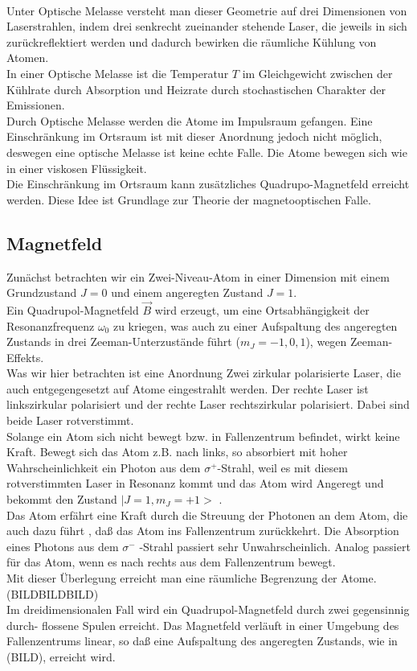 \documentclass[12pt,a4paper]{article}
\begin{document}
 \\Unter Optische Melasse versteht man dieser Geometrie auf drei Dimensionen von Laserstrahlen, indem drei senkrecht zueinander stehende Laser, die jeweils in sich zurückreflektiert werden und dadurch bewirken die räumliche Kühlung von Atomen.
 \\In einer Optische Melasse ist die Temperatur ${T}$ im Gleichgewicht zwischen der Kühlrate durch Absorption und Heizrate durch stochastischen Charakter der Emissionen.
 \\Durch Optische Melasse werden die Atome im Impulsraum gefangen. Eine Einschränkung im Ortsraum ist mit dieser Anordnung jedoch nicht möglich, deswegen eine optische Melasse ist keine echte Falle. Die Atome bewegen sich wie in einer viskosen Flüssigkeit. 
 \\Die Einschränkung im Ortsraum kann zusätzliches Quadrupo-Magnetfeld erreicht werden. Diese Idee ist Grundlage zur Theorie der magnetooptischen Falle.
  \subsection{Magnetfeld}
  Zunächst betrachten wir ein Zwei-Niveau-Atom in einer Dimension mit einem Grundzustand ${J=0}$ und einem angeregten Zustand ${J=1}$. 
  \\Ein Quadrupol-Magnetfeld ${\vec B}$ wird erzeugt, um eine Ortsabhängigkeit der Resonanzfrequenz ${\omega_0}$ zu kriegen, was auch zu einer Aufspaltung des angeregten Zustands in drei Zeeman-Unterzustände führt (${m_J=-1,0,1}$), wegen Zeeman-Effekts.
  \\Was wir hier betrachten ist eine Anordnung Zwei zirkular polarisierte Laser, die auch entgegengesetzt auf Atome eingestrahlt werden. Der rechte Laser ist linkszirkular polarisiert und der rechte Laser rechtszirkular polarisiert. Dabei sind beide Laser rotverstimmt.
  \\Solange ein Atom sich nicht bewegt bzw. in Fallenzentrum befindet, wirkt keine Kraft. Bewegt sich das Atom z.B. nach links, so absorbiert mit hoher Wahrscheinlichkeit ein Photon aus dem ${\sigma^+}$-Strahl, weil es mit diesem rotverstimmten Laser in Resonanz kommt und das Atom wird Angeregt und bekommt den Zustand ${|J=1 , m_J=+1>}$ . 
  \\Das Atom erfährt eine Kraft durch die Streuung der Photonen an dem Atom, die auch dazu führt , daß das Atom ins Fallenzentrum zurückkehrt. Die Absorption eines Photons aus dem ${\sigma^-}$ -Strahl passiert sehr Unwahrscheinlich. Analog passiert für das Atom, wenn es nach rechts aus dem Fallenzentrum bewegt.   
  \\Mit dieser Überlegung erreicht man eine räumliche Begrenzung der Atome. (BILDBILDBILD)
  \\Im dreidimensionalen Fall wird ein Quadrupol-Magnetfeld durch zwei gegensinnig durch- flossene Spulen erreicht. Das Magnetfeld verläuft in einer Umgebung des Fallenzentrums linear, so daß eine Aufspaltung des angeregten Zustands, wie in (BILD), erreicht wird.
\end{document}
